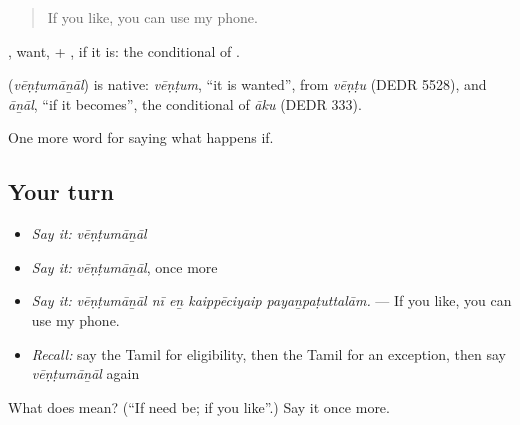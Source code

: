 \begin{quote}
If you like, you can use my phone.
\end{quote}

, want, + , if it is: the conditional of .

\begin{cousinweb}
\textbf{} (\emph{vēṇṭumāṉāl}) is native: \emph{vēṇṭum}, \textquotedblleft{}it is wanted\textquotedblright{}, from \emph{vēṇṭu} (DEDR 5528), and \emph{āṉāl}, \textquotedblleft{}if it becomes\textquotedblright{}, the conditional of \emph{āku} (DEDR 333).
\end{cousinweb}

\begin{grammarlens}[title={What you've built}]
One more word for saying what happens if.
\end{grammarlens}

\subsection*{Your turn}
\begin{itemize}
\raggedright
  \item \emph{Say it:} \emph{vēṇṭumāṉāl}
  \item \emph{Say it:} \emph{vēṇṭumāṉāl}, once more
  \item \emph{Say it:} \emph{vēṇṭumāṉāl nī eṉ kaippēciyaip payaṉpaṭuttalām.} — If you like, you can use my phone.
  \item \emph{Recall:} say the Tamil for eligibility, then the Tamil for an exception, then say \emph{vēṇṭumāṉāl} again
\end{itemize}

\begin{tcolorbox}[breakable,colback=teal!4,colframe=teal!35!black,title={Before you move on}]
What does  mean? (\textquotedblleft{}If need be; if you like\textquotedblright{}.) Say it once more.
\end{tcolorbox}
